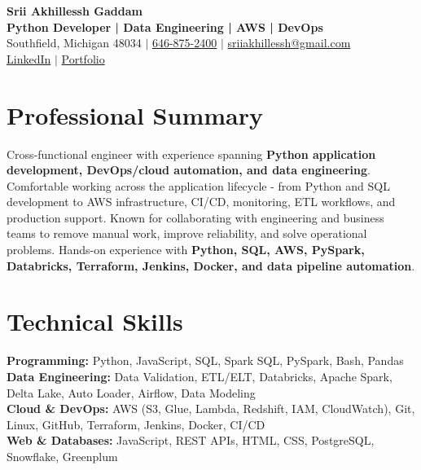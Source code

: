 \documentclass[letterpaper,10pt]{article}
\begin{document}
\fontsize{9.35pt}{10.45pt}\selectfont

\begin{center}
    {\LARGE \textbf{Srii Akhillessh Gaddam}} \\[-1pt]
    \textbf{Python Developer | Data Engineering | AWS | DevOps} \\[2pt]
    Southfield, Michigan 48034 $|$
    \href{tel:6468752400}{646-875-2400} $|$
    \href{mailto:sriiakhillessh@gmail.com}{sriiakhillessh@gmail.com} \\[1pt]
    \href{https://www.linkedin.com/in/srii-akhiilessh-gaddam-b48668191/}{LinkedIn} $|$
    \href{https://sriiakhillesshg.github.io/portfolio/}{Portfolio}
\end{center}
\vspace{-8pt}

\section{Professional Summary}
\small{Cross-functional engineer with experience spanning \textbf{Python application development, DevOps/cloud automation, and data engineering}. Comfortable working across the application lifecycle - from Python and SQL development to AWS infrastructure, CI/CD, monitoring, ETL workflows, and production support. Known for collaborating with engineering and business teams to remove manual work, improve reliability, and solve operational problems. Hands-on experience with \textbf{Python, SQL, AWS, PySpark, Databricks, Terraform, Jenkins, Docker, and data pipeline automation}.}

\section{Technical Skills}
\small{
\textbf{Programming:} Python, JavaScript, SQL, Spark SQL, PySpark, Bash, Pandas \\
\textbf{Data Engineering:} Data Validation, ETL/ELT, Databricks, Apache Spark, Delta Lake, Auto Loader, Airflow, Data Modeling \\
\textbf{Cloud \& DevOps:} AWS (S3, Glue, Lambda, Redshift, IAM, CloudWatch), Git, Linux, GitHub, Terraform, Jenkins, Docker, CI/CD \\
\textbf{Web \& Databases:} JavaScript, REST APIs, HTML, CSS, PostgreSQL, Snowflake, Greenplum
}
\end{document}
